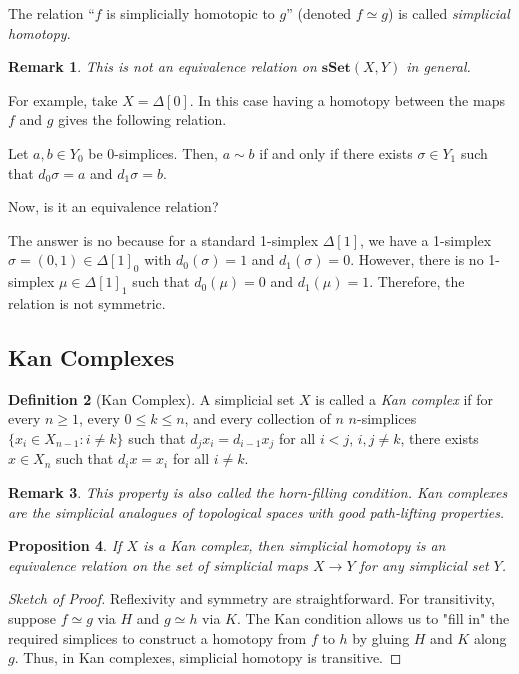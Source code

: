 \documentclass[11pt]{article}
\theoremstyle{definition}
\newtheorem{definition}{Definition}[section]
\theoremstyle{plain}
\newtheorem{proposition}[definition]{Proposition}
\newtheorem{remark}[definition]{Remark}
\begin{document}
The relation ``$f$ is simplicially homotopic to $g$'' (denoted $f \simeq g$) is called \emph{simplicial homotopy}.

\begin{remark}
    This is not an equivalence relation on $\mathbf{sSet}(X,Y)$ in general.

\end{remark}

For example, take $X=\Delta[0]$. In this case  having a homotopy between the maps $f$ and $g$ gives the following relation.

Let  $a, b \in Y_0$  be 0-simplices. Then,  $a \sim b$ if and only if there exists  $ \sigma \in Y_1$ such that $d_0 \sigma = a$ and $d_1 \sigma = b$.


Now, is it an equivalence relation?

The answer is no because for a standard 1-simplex $\Delta[1]$, we have a 1-simplex $\sigma= (0,1) \in \Delta[1]_0 $ with $d_0(\sigma)  = 1$ and $d_1(\sigma) = 0$. However, there is no 1-simplex $\mu \in \Delta[1]_1$ such that $d_0(\mu) = 0$ and $d_1(\mu) = 1$. Therefore, the relation is not symmetric.


\subsection{Kan Complexes}

\begin{definition}[Kan Complex]
    A simplicial set $X$ is called a \emph{Kan complex} if for every $n \geq 1$, every $0 \leq k \leq n$, and every collection of $n$ $n$-simplices $\{x_i \in X_{n-1} : i \neq k\}$ such that $d_j x_i = d_{i-1} x_j$ for all $i < j$, $i, j \neq k$, there exists $x \in X_n$ such that $d_i x = x_i$ for all $i \neq k$.
\end{definition}

\begin{remark}
    This property is also called the \emph{horn-filling condition}. Kan complexes are the simplicial analogues of topological spaces with good path-lifting properties.
\end{remark}

\begin{proposition}
    If $X$ is a Kan complex, then simplicial homotopy is an equivalence relation on the set of simplicial maps $X \to Y$ for any simplicial set $Y$.
\end{proposition}

\begin{proof}[Sketch of Proof]
    Reflexivity and symmetry are straightforward. For transitivity, suppose $f \simeq g$ via $H$ and $g \simeq h$ via $K$. The Kan condition allows us to "fill in" the required simplices to construct a homotopy from $f$ to $h$ by gluing $H$ and $K$ along $g$. Thus, in Kan complexes, simplicial homotopy is transitive.
\end{proof}
\end{document}
